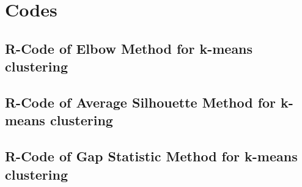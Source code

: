 \lstset{
  language=C, %
  basicstyle=\ttfamily,
  numbers=left,
  numberstyle=\footnotesize,
  stepnumber=1,
  numbersep=2.0mm}

\chapter{Codes}\label{ch:codes}

\section{R-Code of Elbow Method for k-means clustering}


\section{R-Code of Average Silhouette Method for k-means clustering}


\section{R-Code of Gap Statistic Method for k-means clustering}



\endinput

